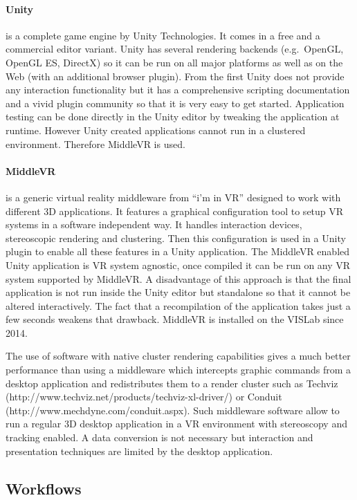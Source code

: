 \paragraph{Unity}
is a complete game engine by Unity Technologies. It comes in a free and
a commercial editor variant. Unity has several rendering backends
(e.g.~OpenGL, OpenGL ES, DirectX) so it can be run on all major
platforms as well as on the Web (with an additional browser plugin).
From the first Unity does not provide any interaction functionality but
it has a comprehensive scripting documentation and a vivid plugin
community so that it is very easy to get started. Application testing
can be done directly in the Unity editor by tweaking the application at
runtime. However Unity created applications cannot run in a clustered
environment. Therefore MiddleVR is used.

\paragraph{MiddleVR}
is a generic virtual reality middleware from ``i'm in VR'' designed to
work with different 3D applications. It features a graphical
configuration tool to setup VR systems in a software independent way. It
handles interaction devices, stereoscopic rendering and clustering. Then
this configuration is used in a Unity plugin to enable all these
features in a Unity application. The MiddleVR enabled Unity application
is VR system agnostic, once compiled it can be run on any VR system
supported by MiddleVR. A disadvantage of this approach is that the final
application is not run inside the Unity editor but standalone so that it
cannot be altered interactively. The fact that a recompilation of the
application takes just a few seconds weakens that drawback. MiddleVR is
installed on the VISLab since 2014.

The use of software with native cluster rendering capabilities gives a
much better performance than using a middleware which intercepts graphic
commands from a desktop application and redistributes them to a render
cluster such as Techviz
(http://www.techviz.net/products/techviz-xl-driver/) or Conduit
(http://www.mechdyne.com/conduit.aspx). Such middleware software allow
to run a regular 3D desktop application in a VR environment with
stereoscopy and tracking enabled. A data conversion is not necessary but
interaction and presentation techniques are limited by the desktop
application.

\subsection{Workflows}
\label{workflows}

